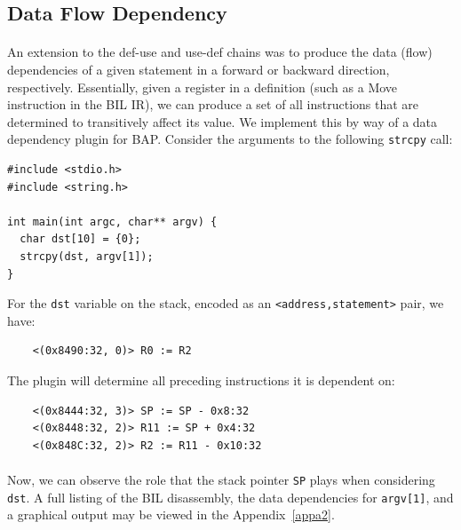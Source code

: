 \documentclass[letterpaper,11pt]{article}
\begin{document}
\subsection{Data Flow Dependency}

\paragraph{}
An extension to the def-use and use-def chains was to produce the data (flow)
dependencies of a given statement in a forward or backward direction,
respectively. Essentially, given a register in a definition (such as a Move
instruction in the BIL IR), we can produce a set of all instructions that are
determined to transitively affect its value. We implement this
by way of a data dependency plugin for BAP. Consider the arguments to the
following \texttt{strcpy} call:

\begin{center}
\lstset{language=C, label=strcpy,
caption=strcpy.c, breaklines=true, basicstyle=\tiny, numbers=none}
\begin{lstlisting}
#include <stdio.h>
#include <string.h>

int main(int argc, char** argv) {
  char dst[10] = {0};
  strcpy(dst, argv[1]);
}
\end{lstlisting}
\end{center}

For the \texttt{dst} variable on the stack, encoded as an
\texttt{<address,statement>} pair, we have:

\begin{verbatim}
    <(0x8490:32, 0)> R0 := R2
\end{verbatim}

The plugin will determine all preceding instructions it is dependent on:

\begin{verbatim}
    <(0x8444:32, 3)> SP := SP - 0x8:32
    <(0x8448:32, 2)> R11 := SP + 0x4:32
    <(0x848C:32, 2)> R2 := R11 - 0x10:32
\end{verbatim}

\paragraph{}
Now, we can observe the role that the stack pointer \texttt{SP} plays
when considering \texttt{dst}. A full listing of the BIL disassembly,
the data dependencies for \texttt{argv[1]}, and a graphical
output may be viewed in
the Appendix~\ref{appa2}.
\end{document}

